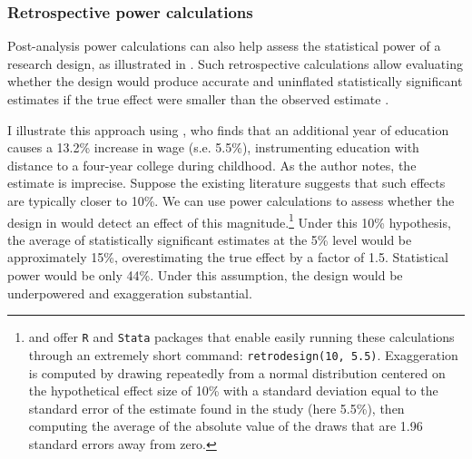 \documentclass[usletter, 12pt]{article}
\begin{document}
				
			\subsubsection{Retrospective power calculations}\label{retro_calc}
				
				Post-analysis power calculations can also help assess the statistical power of a research design, as illustrated in . Such retrospective calculations allow evaluating whether the design would produce accurate and uninflated statistically significant estimates if the true effect were smaller than the observed estimate \citep{gelman_beyond_2014, ioannidis_power_2017, stommes_reliability_2023}. 

				
				I illustrate this approach using \cite{card_using_1993}, who finds that an additional year of education causes a 13.2\% increase in wage (s.e. 5.5\%), instrumenting education with distance to a four-year college during childhood. As the author notes, the estimate is imprecise. Suppose the existing literature suggests that such effects are typically closer to 10\%. We can use power calculations to assess whether the design in \cite{card_using_1993} would detect an effect of this magnitude.\footnote{\cite{timm_retrodesign_2019} and \cite{linden_retrodesign_2019} offer \texttt{R} and \texttt{Stata} packages that enable easily running these calculations through an extremely short command: \texttt{retrodesign(10, 5.5)}. Exaggeration is computed by drawing repeatedly from a normal distribution centered on the hypothetical effect size of 10\% with a standard deviation equal to the standard error of the estimate found in the study (here 5.5\%), then computing the average of the absolute value of the draws that are 1.96 standard errors away from zero.} Under this 10\% hypothesis, the average of statistically significant estimates at the 5\% level would be approximately 15\%, overestimating the true effect by a factor of 1.5. Statistical power would be only 44\%. Under this assumption, the design would be underpowered and exaggeration substantial.
				
\end{document}

